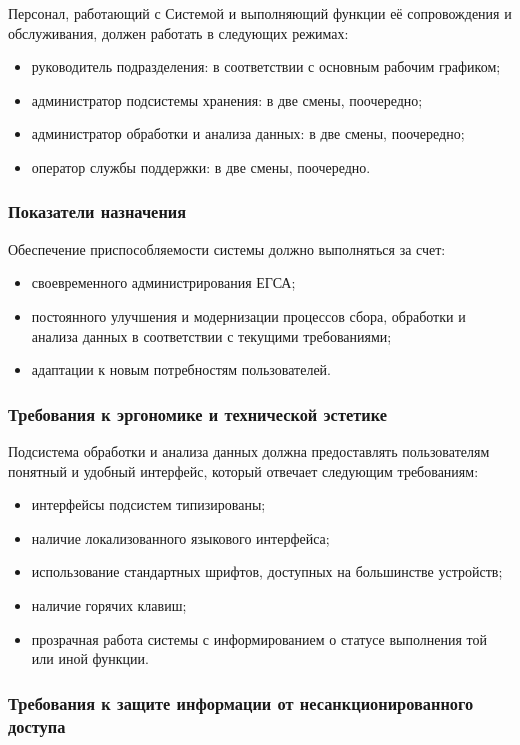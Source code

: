 \documentclass[a4paper, 14pt]{extarticle}
\begin{document}
Персонал, работающий с Системой и выполняющий функции её сопровождения и
обслуживания, должен работать в следующих режимах:
\begin{itemize}
  \item руководитель подразделения: в соответствии с основным рабочим графиком;
  \item администратор подсистемы хранения: в две смены, поочередно;
  \item администратор обработки и анализа данных: в две смены, поочередно;
  \item оператор службы поддержки: в две смены, поочередно.
\end{itemize}

\subsubsection{Показатели назначения}

Обеспечение приспособляемости системы должно выполняться за счет:
\begin{itemize}
  \item своевременного администрирования ЕГСА;
  \item постоянного улучшения и модернизации процессов сбора, обработки и
  анализа данных в соответствии с текущими требованиями;
  \item адаптации к новым потребностям пользователей.
\end{itemize}

\subsubsection{Требования к эргономике и технической эстетике}

Подсистема обработки и анализа данных должна предоставлять пользователям
понятный и удобный интерфейс, который отвечает следующим требованиям:
\begin{itemize}
  \item интерфейсы подсистем типизированы;
  \item наличие локализованного языкового интерфейса;
  \item использование стандартных шрифтов, доступных на большинстве устройств;
  \item наличие горячих клавиш;
  \item прозрачная работа системы с информированием о статусе выполнения той или
  иной функции.
\end{itemize}

\subsubsection{Требования к защите информации от несанкционированного доступа}
\end{document}
